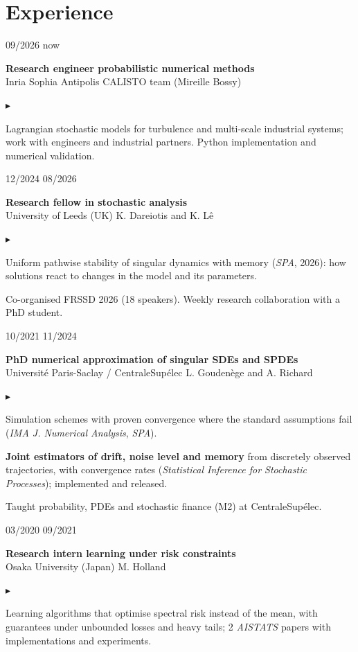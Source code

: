 \documentclass[10pt,a4paper]{article}
\newlength{\datecol}\setlength{\datecol}{0.155\textwidth}
\newlength{\gutter}\setlength{\gutter}{0.85em}
\newlength{\bodycol}
\newcommand{\entry}[3]{%
  \par\vspace{0.50ex}\noindent
  \begin{minipage}[t]{\datecol}
    \vspace{0pt}\raggedright\footnotesize\color{muted}#1
  \end{minipage}%
  \hspace{\gutter}%
  \begin{minipage}[t]{\bodycol}
    \vspace{0pt}\raggedright
    {\headingfont\bfseries\footnotesize #2}\\[0.08ex]
    {\footnotesize\color{accent}#3}
  \end{minipage}%
  \par\vspace{0.10ex}
}
\newenvironment{bullets}
  {\begin{list}{\textcolor{accent}{\scriptsize$\blacktriangleright$}}{%
      \setlength{\leftmargin}{\datecol}
      \addtolength{\leftmargin}{\gutter}
      \addtolength{\leftmargin}{1.15em}
      \setlength{\rightmargin}{0pt}
      \setlength{\labelwidth}{0.85em}
      \setlength{\labelsep}{0.3em}
      \setlength{\itemsep}{0.08ex}
      \setlength{\parsep}{0pt}
      \setlength{\topsep}{0.18ex}
      \setlength{\partopsep}{0pt}
      \footnotesize}}
  {\end{list}}
\begin{document}
\section{Experience}

\entry{09/2026 \textemdash{} now}{Research engineer \textemdash{} probabilistic numerical methods}{Inria Sophia Antipolis \textemdash{} CALISTO team (Mireille Bossy)}
\begin{bullets}
  \item Lagrangian stochastic models for turbulence and multi-scale industrial systems; work with engineers
  and industrial partners. Python implementation and numerical validation.
\end{bullets}

\entry{12/2024 \textemdash{} 08/2026}{Research fellow in stochastic analysis}{University of Leeds (UK) \textemdash{} K. Dareiotis and K. Lê}
\begin{bullets}
  \item Uniform pathwise stability of singular dynamics with memory (\emph{SPA}, 2026): how solutions
  react to changes in the model and its parameters.
  \item Co-organised FRSSD 2026 (18 speakers). Weekly research collaboration with a PhD student.
\end{bullets}

\entry{10/2021 \textemdash{} 11/2024}{PhD \textemdash{} numerical approximation of singular SDEs and SPDEs}{Université Paris-Saclay / CentraleSupélec \textemdash{} L. Goudenège and A. Richard}
\begin{bullets}
  \item Simulation schemes with proven convergence where the standard assumptions fail
  (\emph{IMA J. Numerical Analysis}, \emph{SPA}).
  \item \textbf{Joint estimators of drift, noise level and memory} from discretely observed trajectories, with
  convergence rates (\emph{Statistical Inference for Stochastic Processes}); implemented and released.
  \item Taught probability, PDEs and stochastic finance (M2) at CentraleSupélec.
\end{bullets}

\entry{03/2020 \textemdash{} 09/2021}{Research intern \textemdash{} learning under risk constraints}{Osaka University (Japan) \textemdash{} M. Holland}
\begin{bullets}
  \item Learning algorithms that optimise spectral risk instead of the mean, with guarantees under unbounded
  losses and heavy tails; 2 \emph{AISTATS} papers with implementations and experiments.
\end{bullets}
\end{document}
